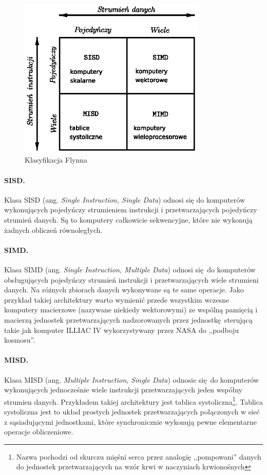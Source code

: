 \begin{figure}
\centering
\includegraphics[width=24em]{images/flynn.eps}
\caption{Klasyfikacja Flynna}
\label{fig:flynn}
\end{figure}

\paragraph{SISD.}
Klasa SISD (ang. \emph{Single Instruction, Single Data}) odnosi się do komputerów wykonujących pojedyńczy strumieniem instrukcji i przetwarzających pojedyńczy strumień danych. Są to komputery całkowicie sekwencyjne, które nie wykonują żadnych obliczeń równoległych.
\paragraph{SIMD.}
Klasa SIMD (ang. \emph{Single Instruction, Multiple Data}) odnosi się do komputerów obsługujących pojedyńczy strumień instrukcji i przetwarzających wiele strumieni danych. Na różnych zbiorach danych wykonywane są te same operacje. Jako przykład takiej architektury warto wymienić przede wszystkim wczesne komputery macierzowe (nazywane niekiedy wektorowymi) ze wspólną pamięcią i macierzą jednostek przetwarzających nadzorowanych przez jednostkę sterującą takie jak komputer ILLIAC IV wykorzystywany przez NASA do ,,podboju kosmosu''.
\paragraph{MISD.}
Klasa MISD (ang. \emph{Multiple Instruction, Single Data}) 
odnosie się do komputerów wykonujących jednocześnie wiele instrukcji przetwarzających jeden współny strumien danych. Przykładem takiej architektury jest tablica systoliczna\footnote{Nazwa pochodzi od skurczu mięśni serca przez analogię ,,pompowani'' danych do jednostek przetwarzających na wzór krwi w naczyniach krwionośnych}. Tablica systoliczna jest to układ prostych jednostek przetwarzających połączonych w sieć z sąsiadującymi jednostkami, które synchronicznie wykonują pewne elementarne operacje obliczeniowe.
